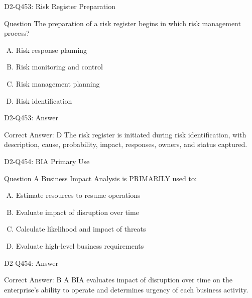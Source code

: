 \documentclass{beamer}
\begin{document}
\begin{frame}{D2-Q453: Risk Register Preparation}
	\begin{block}{Question}
		The preparation of a risk register begins in which risk management process?
	\end{block}
	\begin{enumerate}[(A)]
		\item Risk response planning
		\item Risk monitoring and control
		\item Risk management planning
		\item Risk identification
	\end{enumerate}
\end{frame}
\begin{frame}{D2-Q453: Answer}
	\begin{block}{Correct Answer: D}
		The risk register is initiated during risk identification, with description, cause, probability, impact, responses, owners, and status captured.
	\end{block}
\end{frame}

\begin{frame}{D2-Q454: BIA Primary Use}
	\begin{block}{Question}
		A Business Impact Analysis is PRIMARILY used to:
	\end{block}
	\begin{enumerate}[(A)]
		\item Estimate resources to resume operations
		\item Evaluate impact of disruption over time
		\item Calculate likelihood and impact of threats
		\item Evaluate high-level business requirements
	\end{enumerate}
\end{frame}
\begin{frame}{D2-Q454: Answer}
	\begin{block}{Correct Answer: B}
		A BIA evaluates impact of disruption over time on the enterprise's ability to operate and determines urgency of each business activity.
	\end{block}
\end{frame}
\end{document}
